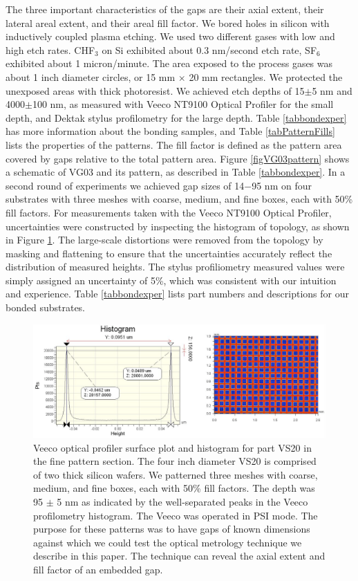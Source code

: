 \documentclass[osajnl,preprint,showpacs,superscriptaddress,12pt]{revtex4-1} %
\begin{document}
The three important characteristics of the gaps are their axial extent, their lateral areal extent, and their areal fill factor.  We bored holes in silicon with inductively coupled plasma etching.  We used two different gases with low and high etch rates.  CHF$_3$ on Si exhibited about 0.3 nm/second etch rate, SF$_6$ exhibited about 1 micron/minute.  The area exposed to the process gases was about 1 inch diameter circles, or 15 mm $\times$ 20 mm rectangles.  We protected the unexposed areas with thick photoresist.  We achieved etch depths of 15$\pm$5 nm and 4000$\pm$100 nm, as measured with Veeco NT9100 Optical Profiler for the small depth, and Dektak stylus profilometry for the large depth.  Table \ref{tabbondexper} has more information about the bonding samples, and Table \ref{tabPatternFills} lists the properties of the patterns.  The fill factor is defined as the pattern area covered by gaps relative to the total pattern area.  Figure \ref{figVG03pattern} shows a schematic of VG03 and its pattern, as described in Table \ref{tabbondexper}.  In a second round of experiments we achieved gap sizes of 14$-$95 nm on four substrates with three meshes with coarse, medium, and fine boxes, each with 50\% fill factors.  For measurements taken with the Veeco NT9100 Optical Profiler, uncertainties were constructed by inspecting the histogram of topology, as shown in Figure \ref{figVS20pattern}.  The large-scale distortions were removed from the topology by masking and flattening to ensure that the uncertainties accurately reflect the distribution of measured heights.  The stylus profiliometry measured values were simply assigned an uncertainty of 5\%, which was consistent with our intuition and experience.  Table \ref{tabbondexper} lists part numbers and descriptions for our bonded substrates.

\begin{figure}[htbp]
\centerline{\includegraphics[width=1.0\columnwidth]{figs/VS20fineGapCrop.pdf}}
\caption{Veeco optical profiler surface plot and histogram for part VS20 in the fine pattern section\label{figVS20pattern}.  The four inch diameter VS20 is comprised of two thick silicon wafers.  We patterned three meshes with coarse, medium, and fine boxes, each with 50\% fill factors.  The depth was 95 $\pm$ 5 nm as indicated by the well-separated peaks in the Veeco profilometry histogram.  The Veeco was operated in PSI mode.  The purpose for these patterns was to have gaps of known dimensions against which we could test the optical metrology technique we describe in this paper.  The technique can reveal the axial extent and fill factor of an embedded gap.  }
\end{figure}
\end{document}
